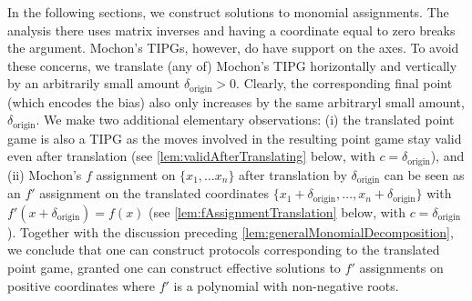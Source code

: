 \documentclass{article}
\newcommand{\atul}[1]{#1} %
\newcommand{\dorigin}[0]{\delta_{\textrm{origin}}} %
\begin{document}
In the following sections, we construct solutions to monomial assignments. The analysis there uses matrix inverses and having a coordinate equal to zero breaks the argument. \atul{Mochon's TIPGs, however, do have support on the axes. To avoid these concerns, we translate (any of) Mochon's TIPG horizontally and vertically by an arbitrarily small amount $\dorigin>0$. Clearly, the corresponding final point (which encodes the bias) also only increases by the same arbitraryl small amount, $\dorigin$. We make two additional elementary observations: (i) the translated point game is also a TIPG as the moves involved in the resulting point game stay valid even after translation (see \cref{lem:validAfterTranslating} below, with $c=\dorigin$), and (ii) Mochon's $f$ assignment on $\{x_1,\dots x_n\}$ after translation by $\dorigin$ can be seen as an $f'$ assignment on the translated coordinates $\{x_1 +\dorigin,\dots ,x_n+\dorigin \}$ with $f'(x + \dorigin) = f(x)$ (see \cref{lem:fAssignmentTranslation} below, with $c=\dorigin$). %
  Together with the discussion preceding \cref{lem:generalMonomialDecomposition}, we conclude that one can construct protocols corresponding to the translated point game, granted one can construct effective solutions to $f'$ assignments on positive coordinates where $f'$ is a polynomial with non-negative roots.}

%
%
%
%
%
\end{document}
